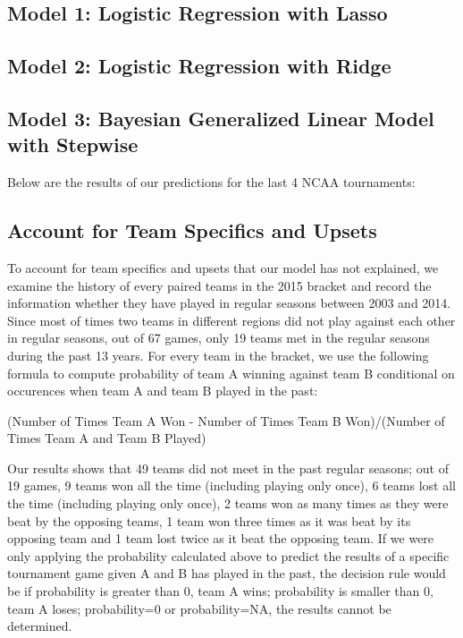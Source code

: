 \documentclass{article} %
\begin{document}
\subsection{Model 1: Logistic Regression with Lasso}

\subsection{Model 2: Logistic Regression with Ridge}

\subsection{Model 3: Bayesian Generalized Linear Model with Stepwise}

Below are the results of our predictions for the last 4 NCAA tournaments:\





\subsection{Account for Team Specifics and Upsets}

To account for team specifics and upsets that our model has not explained, we examine the history of every paired teams in the 2015 bracket and record the information whether they have played in regular seasons between 2003 and 2014. Since most of times two teams in different regions did not play against each other in regular seasons, out of 67 games, only 19 teams met in the regular seasons during the past 13 years. For every team in the bracket, we use the following formula to compute probability of team A winning against team B conditional on occurences when team A and team B played in the past:

(Number of Times Team A Won - Number of Times Team B Won)/(Number of Times Team A and Team B Played)


Our results shows that 49 teams did not meet in the past regular seasons; out of 19 games, 9 teams won all the time (including playing only once), 6 teams lost all the time (including playing only once), 2 teams won as many times as they were beat by the opposing teams, 1 team won three times as it was beat by its opposing team and 1 team lost twice as it beat the opposing team. If we were only applying the probability calculated above to predict the results of a specific tournament game given A and B has played in the past, the decision rule would be if probability is greater than 0, team A wins; probability is smaller than 0, team A loses; probability=0 or probability=NA, the results cannot be determined. 
\end{document}
